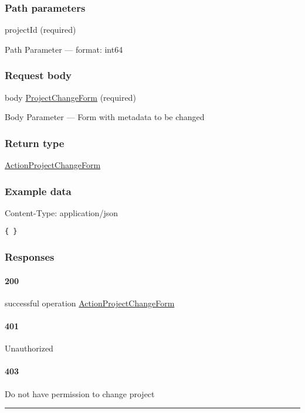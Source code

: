 \hypertarget{path-parameters-18}{%
\subsubsection*{Path parameters}\label{path-parameters-18}}

projectId (required)

{Path Parameter} --- format: int64

\hypertarget{request-body-6}{%
\subsubsection*{Request body}\label{request-body-6}}

body \protect\hyperlink{ProjectChangeForm}{ProjectChangeForm} (required)

{Body Parameter} --- Form with metadata to be changed

\hypertarget{return-type-21}{%
\subsubsection*{Return type}\label{return-type-21}}

\protect\hyperlink{ActionProjectChangeForm}{ActionProjectChangeForm}

\hypertarget{example-data-21}{%
\subsubsection*{Example data}\label{example-data-21}}

Content-Type: application/json

\begin{verbatim}
{ }
\end{verbatim}

\hypertarget{responses-21}{%
\subsubsection*{Responses}\label{responses-21}}

\hypertarget{section-74}{%
\paragraph{200}\label{section-74}}

successful operation
\protect\hyperlink{ActionProjectChangeForm}{ActionProjectChangeForm}

\hypertarget{section-75}{%
\paragraph{401}\label{section-75}}

Unauthorized \protect\hyperlink{}{}

\hypertarget{section-76}{%
\paragraph{403}\label{section-76}}

Do not have permission to change project \protect\hyperlink{}{}

\begin{center}\rule{0.5\linewidth}{0.5pt}\end{center}
